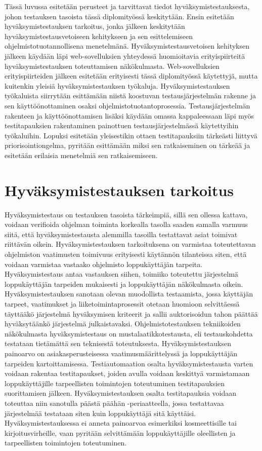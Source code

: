 Tässä luvussa esitetään perusteet ja tarvittavat tiedot hyväksymistestauksesta, johon testauksen tasoista tässä diplomityössä keskitytään.
Ensin esitetään hyväksymistestauksen tarkoitus, jonka jälkeen keskitytään hyväksymistestausvetoiseen kehitykseen ja sen esittelemiseen ohjelmistotuotannollisena menetelmänä.
Hyväksymistestausvetoisen kehityksen jälkeen käydään läpi web-sovelluksien yhteydessä huomioitavia erityispiirteitä hyväksymistestauksen toteuttamisen näkökulmasta.
Web-sovelluksien erityispiirteiden jälkeen esitetään erityisesti tässä diplomityössä käytettyjä, mutta kuitenkin yleisiä hyväksymistestauksen työkaluja.
Hyväksymistestauksen työkaluista siirrytään esittämään niistä koostuvan testausjärjestelmän rakenne ja sen käyttöönottaminen osaksi ohjelmistotuotantoprosessia.
Testausjärjestelmän rakenteen ja käyttöönottamisen lisäksi käydään omassa kappaleessaan läpi myös testitapauksien rakentaminen painottuen testausjärjestelmässä käytettyihin työkaluihin.
Lopuksi esitetään yleisestikin ottaen testitapauksiin tärkeästi liittyvä priorisointiongelma, pyritään esittämään miksi sen ratkaiseminen on tärkeää ja esitetään erilaisia menetelmiä sen ratkaisemiseen.

\section{Hyväksymistestauksen tarkoitus} \label{ch:08_hyvaksymistestauksen_tarkoitus}

  Hyväksymistestaus on testauksen tasoista tärkeimpiä, sillä sen ollessa kattava, voidaan verifioida ohjelman toiminta korkealla tasolla saaden samalla varmuus siitä, että hyväksymistestausta alemmilla tasoilla testattavat asiat toimivat riittävän oikein.
  Hyväksymistestauksen tarkoituksena on varmistaa toteutettavan ohjelmiston vaatimusten toimivuus erityisesti käytännön tilanteissa siten, että voidaan varmistaa vastaako ohjelmisto loppukäyttäjän tarpeita.
  Hyväksymistestaus antaa vastauksen siihen, toimiiko toteutettu järjestelmä loppukäyttäjän tarpeiden mukaisesti ja loppukäyttäjän näkökulmasta oikein.
  Hyväksymistestauksen sanotaan olevan muodollista testaamista, jossa käyttäjän tarpeet, vaatimukset ja liiketoimintaprosessit otetaan huomioon selvittäessä täyttääkö järjestelmä hyväksymisen kriteerit ja sallii auktorisoidun tahon päättää hyväksytäänkö järjestelmä \parencite{istqb_glossary_nodate} julkaistavaksi.
  Ohjelmistotestauksen tekniikoiden näkökulmasta hyväksymistestaus on mustalaatikkotestausta, eli testauskohdetta testataan tietämättä sen teknisestä toteutuksesta.
  Hyväksymistestauksen painoarvo on asiakasperusteisessa vaatimusmäärittelyssä ja loppukäyttäjän tarpeiden kartoittamisessa.
  Testiautomaation osalta hyväksymistestausta varten voidaan rakentaa testitapaukset, joiden avulla voidaan keskittyä varmistamaan loppukäyttäjille tarpeellisten toimintojen toteutuminen testitapauksien suorittamisen jälkeen.
  Hyväksymistestauksen osalta testitapauksia voidaan toteuttaa niin sanotulla päästä päähän -periaatteella, jossa testattavaa järjestelmää testataan siten kuin loppukäyttäjä sitä käyttäisi.
  Hyväksymistestauksessa ei anneta painoarvoa esimerkiksi kosmeettisille tai kirjoitusvirheille, vaan pyritään selvittämään loppukäyttäjille oleellisten ja tarpeellisten toimintojen toteutuminen.

